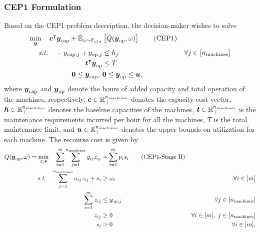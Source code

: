 \subsubsection{CEP1 Formulation} \label{appendix:cep1_formulation}
 Based on the CEP1 problem description, the decision-maker wishes to solve
    \begin{align}\label{eq:cep1}
    \min_{\boldsymbol{y}}\quad   \boldsymbol{c}^{\intercal} \boldsymbol{y}_{\text{cap}} +  \mathbb{E}_{\omega \sim \mathbb{P}_{\omega|\boldsymbol{x}}}& \left[ Q(\boldsymbol{y}_{\text{op}} , \omega)\right]  \tag{CEP1}  \\ \textit{s.t.}  \quad  -y_{\text{cap}, j} + y_{\text{op},j} & \leq h_j  & \forall j \in [n_{\text{machines}}]  \notag \\
    \quad  \boldsymbol{t}^{\intercal} \boldsymbol{y}_{\text{op}} & \leq T \notag \\
    \quad  \boldsymbol{0} \leq \boldsymbol{y}_{\text{cap}},\ & \boldsymbol{0} \leq \boldsymbol{y}_{\text{op}} \leq \boldsymbol{u}, \notag
    \end{align}
where $\boldsymbol{y}_{\text{cap}}$ and $\boldsymbol{y}_{\text{op}}$ denote the hours of added capacity and total operation of the machines, respectively. $\boldsymbol{c} \in \mathbb{R}_+^{n_{\text{machines}}}$ denotes the capacity cost vector, $\boldsymbol{h} \in \mathbb{R}_+^{n_{\text{machines}}}$ denotes the baseline capacities of the machines, $\boldsymbol{t} \in \mathbb{R}_+^{n_{\text{machines}}}$ is the maintenance requirements incurred per hour for all the machines, $T$ is the total maintenance limit, and $\boldsymbol{u} \in \mathbb{R}_+^{n_{\text{machines}}}$ denotes the upper bounds on utilization for each machine. The recourse cost is given by
    \begin{align}\label{eq:cep1stage2}
    Q(\boldsymbol{y}_{\text{op}}, \omega) = \min_{\boldsymbol{z}, \boldsymbol{s}} \quad   \sum_{i=1}^m \sum_{j=1}^{n_{\text{machines}}} g_{ij} z_{ij} &+ \sum_{i=1}^m p_i s_i  \tag{CEP1-Stage II} \\ \textit{s.t.}  \quad  \sum_{j=1}^{n_{\text{machines}}} a_{ij} z_{ij} +s_i & \geq \omega_i  & \forall i \in [m]  \notag \\
    \quad  \sum_{i=1}^m z_{ij} & \leq y_{\text{op}, j} & \forall j \in [n_{\text{machines}}] \notag \\
    \quad  z_{ij} & \geq 0 & \forall i \in [m], \ j \in [n_{\text{machines}}]  \notag \\
    \quad s_i & \geq 0 & \forall i \in [m], \notag
    \end{align} 
